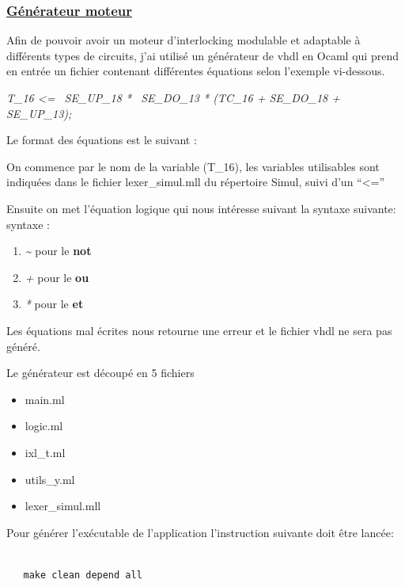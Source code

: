 \newpage

\subsubsection{\underline{Générateur moteur}}
\label{sec:Générateur}


Afin de pouvoir avoir un moteur d'interlocking modulable et adaptable
à différents types de circuits, j'ai utilisé un générateur de vhdl en
Ocaml qui prend en entrée un fichier contenant  différentes
équations selon l'exemple vi-dessous.

\emph{T\_16 <= ~SE\_UP\_18 * ~SE\_DO\_13 * (TC\_16 + SE\_DO\_18 + SE\_UP\_13);}


Le format des équations est le suivant :


On commence par le nom de la variable (T\_16), les variables utilisables sont
indiquées dans le fichier lexer\_simul.mll du répertoire Simul, suivi
d'un ``<='' 

Ensuite on met l'équation logique qui nous intéresse suivant la syntaxe suivante:
syntaxe :
\begin{enumerate}[->]
    \item \emph{\~} pour le \textbf{not}
    \item \emph{+} pour le \textbf{ou}
    \item \emph{*} pour le \textbf{et}
    \end{enumerate}

\medskip

Les équations mal écrites nous retourne une erreur et le fichier vhdl
ne sera pas généré.

\newpage

Le générateur est découpé en 5 fichiers
\begin{itemize}
   \item main.ml
   \item logic.ml
   \item ixl\_t.ml
   \item utils\_y.ml
   \item lexer\_simul.mll
\end{itemize}  

\medskip

Pour générer l'exécutable de l'application l'instruction suivante doit être lancée:

\begin{lstlisting}

   make clean depend all

\end{lstlisting}
  
